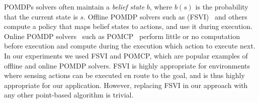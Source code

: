 \documentclass[letterpaper]{article} %
\newcommand{\tuple}[1]{\ensuremath{\left \langle #1 \right \rangle }}
\begin{document}
POMDPs solvers often maintain a \emph{belief state} $b$, where $b(s)$ is the probability that the current state is $s$.
Offline POMDP solvers such as (FSVI)~\cite{shani2007forward} and others \cite{pineau2003point,spaan2005perseus,smith2012point} compute a policy that maps belief states to actions, and use it during execution.
Online POMDP solvers~\cite{washington1997bi,silver2010monte,somani2013despot} such as POMCP~\cite{silver2010monte} perform little or no computation before execution and compute during the execution which action to execute next.
In our experiments we used FSVI and POMCP, which are popular examples of offline and online POMDP solvers. FSVI is highly appropriate for environments where sensing actions can be executed en route to the goal, and is thus highly appropriate for our application. However, replacing FSVI in our approach with any other point-based algorithm is trivial.


\end{document}
